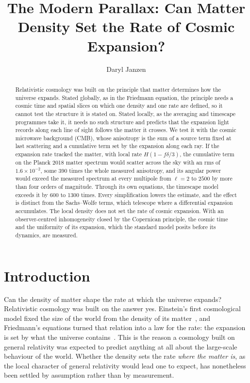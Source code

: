 \documentclass[twocolumn]{aastex701}
\begin{document}
\title{The Modern Parallax: Can Matter Density Set the Rate of Cosmic Expansion?}

\author[gname=Daryl,sname=Janzen]{Daryl Janzen}

\begin{abstract}
Relativistic cosmology was built on the principle that matter determines how the universe expands. Stated globally, as in the Friedmann equation, the principle needs a cosmic time and spatial slices on which one density and one rate are defined, so it cannot test the structure it is stated on. Stated locally, as the averaging and timescape programmes take it, it needs no such structure and predicts that the expansion light records along each line of sight follows the matter it crosses. We test it with the cosmic microwave background (CMB), whose anisotropy is the sum of a source term fixed at last scattering and a cumulative term set by the expansion along each ray. If the expansion rate tracked the matter, with local rate $H(1-f\delta/3)$, the cumulative term on the Planck 2018 matter spectrum would scatter across the sky with an rms of $1.6\times10^{-2}$, some 390 times the whole measured anisotropy, and its angular power would exceed the measured spectrum at every multipole from $\ell=2$ to $2500$ by more than four orders of magnitude. Through its own equations, the timescape model exceeds it by 600 to 1300 times. Every simplification lowers the estimate, and the effect is distinct from the Sachs--Wolfe terms, which telescope where a differential expansion accumulates. The local density does not set the rate of cosmic expansion. With an observer-centred inhomogeneity closed by the Copernican principle, the cosmic time and the uniformity of its expansion, which the standard model posits before its dynamics, are measured.
\end{abstract}


\section{Introduction}\label{sec:intro}

Can the density of matter shape the rate at which the universe expands? Relativistic cosmology was built on the answer yes. Einstein's first cosmological model fixed the size of the world from the density of its matter~\citep{Einstein1917}, and Friedmann's equations turned that relation into a law for the rate: the expansion is set by what the universe contains~\citep{Friedmann1922, Friedmann1924}. This is the reason a cosmology built on general relativity was expected to predict anything at all about the large-scale behaviour of the world. Whether the density sets the rate \emph{where the matter is}, as the local character of general relativity would lead one to expect, has nonetheless been settled by assumption rather than by measurement.
\end{document}
